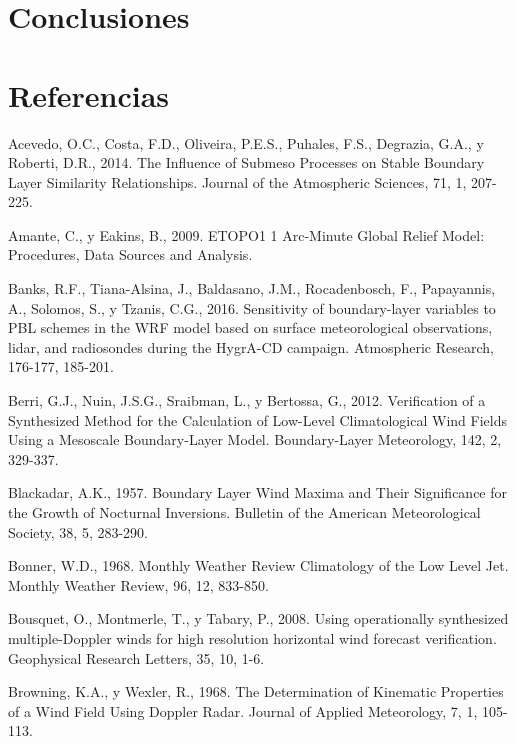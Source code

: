 \documentclass[12pt,spanish,oneside]{book}
\begin{document}
\chapter{Conclusiones}\label{conclusiones}

\chapter*{Referencias}\label{referencias}

\hypertarget{refs}{}
\hypertarget{ref-Acevedo2014}{}
Acevedo, O.C., Costa, F.D., Oliveira, P.E.S., Puhales, F.S., Degrazia,
G.A., y Roberti, D.R., 2014. The Influence of Submeso Processes on
Stable Boundary Layer Similarity Relationships. Journal of the
Atmospheric Sciences, 71, 1, 207-225.

\hypertarget{ref-Amante2009}{}
Amante, C., y Eakins, B., 2009. ETOPO1 1 Arc-Minute Global Relief Model:
Procedures, Data Sources and Analysis.

\hypertarget{ref-Banks2016}{}
Banks, R.F., Tiana-Alsina, J., Baldasano, J.M., Rocadenbosch, F.,
Papayannis, A., Solomos, S., y Tzanis, C.G., 2016. Sensitivity of
boundary-layer variables to PBL schemes in the WRF model based on
surface meteorological observations, lidar, and radiosondes during the
HygrA-CD campaign. Atmospheric Research, 176-177, 185-201.

\hypertarget{ref-Berri2012}{}
Berri, G.J., Nuin, J.S.G., Sraibman, L., y Bertossa, G., 2012.
Verification of a Synthesized Method for the Calculation of Low-Level
Climatological Wind Fields Using a Mesoscale Boundary-Layer Model.
Boundary-Layer Meteorology, 142, 2, 329-337.

\hypertarget{ref-Blackadar1957}{}
Blackadar, A.K., 1957. Boundary Layer Wind Maxima and Their Significance
for the Growth of Nocturnal Inversions. Bulletin of the American
Meteorological Society, 38, 5, 283-290.

\hypertarget{ref-Bonner1968}{}
Bonner, W.D., 1968. Monthly Weather Review Climatology of the Low Level
Jet. Monthly Weather Review, 96, 12, 833-850.

\hypertarget{ref-Bousquet2008}{}
Bousquet, O., Montmerle, T., y Tabary, P., 2008. Using operationally
synthesized multiple-Doppler winds for high resolution horizontal wind
forecast verification. Geophysical Research Letters, 35, 10, 1-6.

\hypertarget{ref-Browning1968}{}
Browning, K.A., y Wexler, R., 1968. The Determination of Kinematic
Properties of a Wind Field Using Doppler Radar. Journal of Applied
Meteorology, 7, 1, 105-113.
\end{document}
